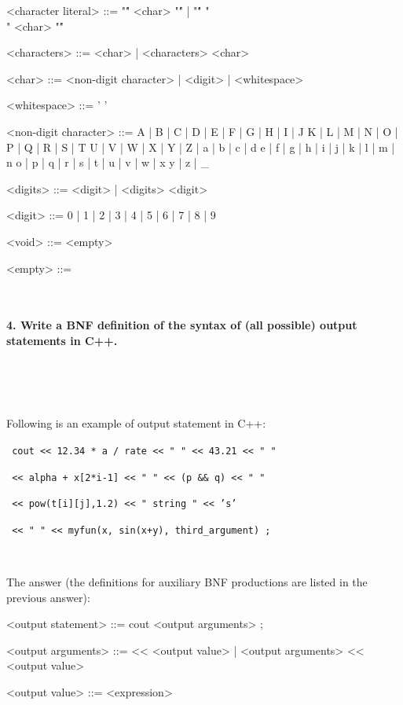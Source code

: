 \documentclass{article}
\begin{document}
\begin{grammar}
		<character literal> ::= "\'" <char> "\'" | "\'" "\\" <char> "\'"

		<characters> ::= <char> | <characters> <char>
		
		<char> ::= <non-digit character> | <digit> | <whitespace>
		
		<whitespace> ::= ' '
		
		<non-digit character> ::= A | B | C | D | E | F | G | H | I | J
			  				 \alt K | L | M | N | O | P | Q | R | S | T 
			   			     \alt U | V | W | X | Y | Z | a | b | c | d 
			  				 \alt e | f | g | h | i | j | k | l | m | n
			   				 \alt o | p | q | r | s | t | u | v | w | x 
			  				 \alt y | z | _
		
		<digits> ::= <digit> | <digits> <digit>
		
		<digit> ::= 0 | 1 | 2 | 3 | 4 | 5 | 6 | 7 | 8 | 9
		
		<void> ::= <empty>
		
		<empty> ::= \

	\end{grammar}
	
	
	
	
	\rmfamily\
	
	\paragraph{4. Write a BNF definition of the syntax of (all possible) output statements in C++. }\
	
	\rmfamily\

	
		Following is an example of output statement in C++:
		\newline

	
		\texttt{ cout << 12.34 * a / rate << " " << 43.21 << " " }
		
		\texttt{ 	  << alpha + x[2*i-1] << " " << (p \&\& q) << " " }
		
		\texttt{      << pow(t[i][j],1.2) << " string " << 's' }
		
		\texttt{      << " " << myfun(x, sin(x+y), third_argument) ; } 
		
		\rmfamily\
		
		
		The answer (the definitions for auxiliary BNF productions are listed in the previous answer):
		
	\ttfamily
	\begin{grammar}
	
		<output statement> ::= cout <output arguments> ;
		
		<output arguments> ::= << <output value> | <output arguments> << <output value>
		
		<output value> ::= <expression>
		
	\end{grammar}
\end{document}
